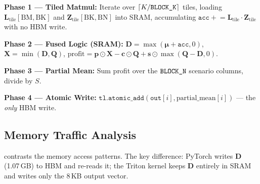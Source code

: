 \textbf{Phase 1 --- Tiled Matmul:} Iterate over $\lceil K/\texttt{BLOCK\_K} \rceil$ tiles, loading $\mathbf{L}_\text{tile}[\text{BM},\text{BK}]$ and $\mathbf{Z}_\text{tile}[\text{BK},\text{BN}]$ into SRAM, accumulating $\texttt{acc} \mathrel{+}= \mathbf{L}_\text{tile} \cdot \mathbf{Z}_\text{tile}$ with no HBM write.

\textbf{Phase 2 --- Fused Logic (SRAM):} $\mathbf{D} = \max(\bm{\mu} + \texttt{acc}, 0)$, $\mathbf{X} = \min(\mathbf{D}, \mathbf{Q})$, $\text{profit} = \mathbf{p} \odot \mathbf{X} - \mathbf{c} \odot \mathbf{Q} + \mathbf{s} \odot \max(\mathbf{Q}-\mathbf{D}, 0)$.

\textbf{Phase 3 --- Partial Mean:} Sum profit over the $\texttt{BLOCK\_N}$ scenario columns, divide by $S$.

\textbf{Phase 4 --- Atomic Write:} $\texttt{tl.atomic\_add}(\texttt{out}[i], \text{partial\_mean}[i])$ --- the \emph{only} HBM write.

\subsection{Memory Traffic Analysis}

 contrasts the memory access patterns. The key difference: PyTorch writes $\mathbf{D}$ (1.07\,GB) to HBM and re-reads it; the Triton kernel keeps $\mathbf{D}$ entirely in SRAM and writes only the 8\,KB output vector.

